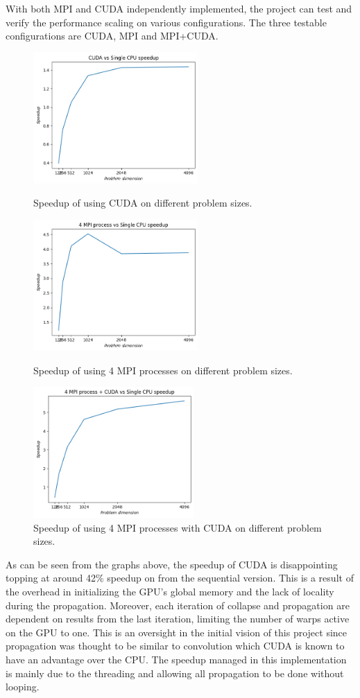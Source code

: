 With both MPI and CUDA independently implemented, the project can test and verify the performance scaling on various configurations. The three testable configurations are CUDA, MPI and MPI+CUDA.


\begin{figure}[!htb]
    \centering
    \includegraphics[height=5cm]{images/CUDA_speedup.png}
    \caption{Speedup of using CUDA on different problem sizes.}
    \endminipage\hfill
    \centering
    \includegraphics[height=5cm]{images/MPI_speedup.png}
    \caption{Speedup of using 4 MPI processes on different problem sizes.}
    \endminipage\hfill
    \centering
    \centering
    \includegraphics[height=5cm]{images/MPI_CUDA_speedup.png}
    \caption{Speedup of using 4 MPI processes with CUDA on different problem sizes.}
    \endminipage\hfill
\end{figure}

As can be seen from the graphs above, the speedup of CUDA is disappointing topping at around 42\% speedup on from the sequential version. This is a result of the overhead in initializing the GPU's global memory and the lack of locality during the propagation. Moreover, each iteration of collapse and propagation are dependent on results from the last iteration, limiting the number of warps active on the GPU to one. This is an oversight in the initial vision of this project since propagation was thought to be similar to convolution which CUDA is known to have an advantage over the CPU. The speedup managed in this implementation is mainly due to the threading and allowing all propagation to be done without looping. 

